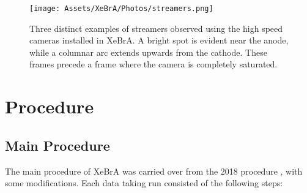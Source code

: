 \begin{figure}
    \centering
    \texttt{[image: Assets/XeBrA/Photos/streamers.png]}
    \caption[Three distinct examples of streamers observed using the high speed cameras installed in XeBrA.]%
    {Three distinct examples of streamers observed using the high speed cameras installed in XeBrA.
    A bright spot is evident near the anode, while a columnar arc extends upwards from the cathode. These frames precede a frame where the camera is completely saturated.}
    \label{fig:streamers}
\end{figure}
\afterpage{\FloatBarrier}
\section{Procedure}
\subsection{Main Procedure}
The main procedure of XeBrA was carried over from the 2018 procedure \cite{tvrznikova_sub-gev_2019}, with some modifications.
Each data taking run consisted of the following steps:
